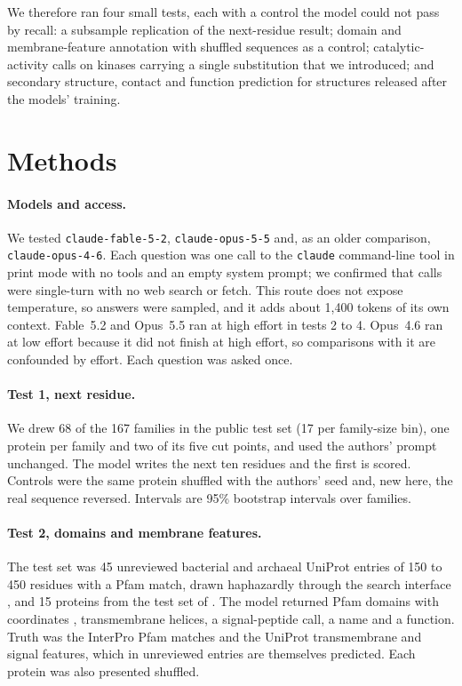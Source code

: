 \documentclass[11pt]{article}
\begin{document}
We therefore ran four small tests, each with a control the model could not pass by recall: a subsample
replication of the next-residue result; domain and membrane-feature annotation with shuffled sequences as
a control; catalytic-activity calls on kinases carrying a single substitution that we introduced; and
secondary structure, contact and function prediction for structures released after the models' training.

\section{Methods}

\paragraph{Models and access.} We tested \texttt{claude-fable-5-2}, \texttt{claude-opus-5-5} and, as an
older comparison, \texttt{claude-opus-4-6}. Each question was one call to the \texttt{claude} command-line
tool in print mode with no tools and an empty system prompt; we confirmed that calls were single-turn with
no web search or fetch. This route does not expose temperature, so answers were sampled, and it adds about
1,400 tokens of its own context. Fable~5.2 and Opus~5.5 ran at high effort in tests 2 to 4. Opus~4.6 ran at
low effort because it did not finish at high effort, so comparisons with it are confounded by effort.
Each question was asked once.

\paragraph{Test 1, next residue.} We drew 68 of the 167 families in the public test set
\citep{tu2026probe} (17 per family-size bin), one protein per family and two of its five cut points, and
used the authors' prompt unchanged. The model writes the next ten residues and the first is scored.
Controls were the same protein shuffled with the authors' seed and, new here, the real sequence reversed.
Intervals are 95\% bootstrap intervals over families.

\paragraph{Test 2, domains and membrane features.} The test set was 45 unreviewed bacterial and archaeal
UniProt entries of 150 to 450 residues with a Pfam match, drawn haphazardly through the search interface
\citep{uniprot}, and 15 proteins from the test set of \citep{tu2026probe}. The model returned Pfam domains
with coordinates \citep{mistry2021pfam}, transmembrane helices, a signal-peptide call, a name and a
function. Truth was the InterPro Pfam matches and the UniProt transmembrane and signal features, which in
unreviewed entries are themselves predicted. Each protein was also presented shuffled.
\end{document}
